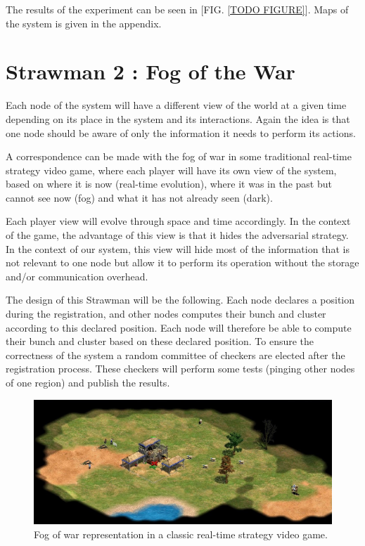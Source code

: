 \documentclass[a4paper,11pt,oneside]{report}
\begin{document}
The results of the experiment can be seen in [FIG. \autoref{TODO FIGURE}]. Maps of
the system is given in the appendix.

\section{Strawman 2 : Fog of the War}

Each node of the system will have a different view of the world at a given time
depending on its place in the system and its interactions. Again the idea is
that one node should be aware of only the information it needs to perform its
actions. 

A correspondence can be made with the fog of war in some traditional real-time
strategy video game, where each player will have its own view of the system,
based on where it is now (real-time evolution), where it was in the past but
cannot see now (fog) and what it has not already seen (dark).

Each player view will evolve through space and time accordingly. In the context
of the game, the advantage of this view is that it hides the adversarial
strategy. In the context of our system, this view will hide most of the
information that is not relevant to one node but allow it to perform its
operation without the storage and/or communication overhead. 

The design of this Strawman will be the following. Each node declares a
position during the registration, and other nodes computes their bunch and
cluster according to this declared position. Each node will therefore be able
to compute their bunch and cluster based on these declared position. To ensure
the correctness of the system a random committee of checkers are elected after
the registration process. These checkers will perform some tests (pinging other
nodes of one region) and publish the results. 

\begin{figure}[!h] 
\centering
\includegraphics[width=400pt]{figures/fog_of_war}
\caption{Fog of war representation in a classic real-time strategy video game. }
\label{fig:registrationprotocol}
\end{figure}
\end{document}

